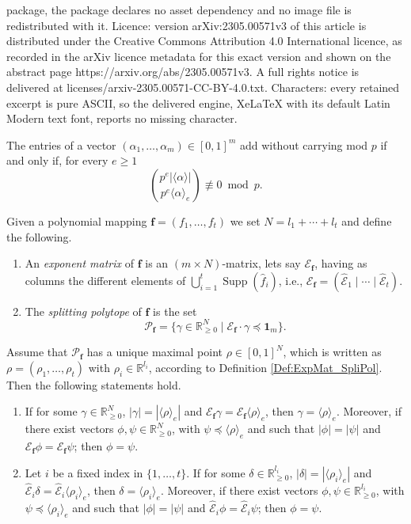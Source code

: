 \documentclass[10pt,a4paper]{amsart}
\newcommand{\Bf}{\boldsymbol{f}}
\newcommand{\E}{\mathcal{E}}
\newcommand{\RR}{\mathbb{R}}
\newcommand{\SP}{\mathcal{P}}
\newcommand{\Supp}{\operatorname{Supp}}
\newcommand{\tE}{\operatorname{\widehat{\E}}}
\begin{document}
package, the package declares no asset dependency and no image file is redistributed with it. Licence: version arXiv:2305.00571v3 of this article is distributed under the Creative Commons Attribution 4.0 International licence, as recorded in the arXiv licence metadata for this exact version and shown on the abstract page https://arxiv.org/abs/2305.00571v3. A full rights notice is delivered at licenses/arxiv-2305.00571-CC-BY-4.0.txt. Characters: every retained excerpt is pure ASCII, so the delivered engine, XeLaTeX with its default Latin Modern text font, reports no missing character.
\begin{corollary}\label{Cor:adding wo carrying}
	The entries of a vector $(\alpha_1,\ldots,\alpha_m)\in[0,1]^m$ add without carrying mod $p$ if and only if, for every $e\geq 1$
	\[\binom{p^e |\langle\alpha\rangle|}{p^e \langle\alpha\rangle_e}  \not \equiv 0 \bmod p.
	\]
\end{corollary}

\begin{definition}\label{Def:ExpMat_SpliPol}
Given a polynomial mapping $\Bf=(f_1, \ldots, f_t)$ we set $N=l_1+\cdots+l_t$ and define the following.
\begin{enumerate}
\item An \textit{exponent matrix} of $\Bf$ is an $(m \times N)$-matrix, lets say $\E_{\Bf}$, having as columns the different elements of $\bigcup_{i=1}^t\Supp(\hat{f}_i)$, i.e., $\E_{\Bf}=(\tE_{1}\mid \cdots\mid \tE_{t})$.
\item The \textit{splitting polytope} of $\Bf$ is the set 
\[\SP_{\Bf}=\{\gamma \in \RR_{\geq 0}^{N} \mid \E_{\Bf}\cdot \gamma \preceq \textbf{1}_{m}\}.\]
\end{enumerate}
\end{definition}

\begin{lemma}\label{equal-vector}
Assume that $\SP_{\Bf}$ has a unique maximal point $\rho\in [0,1]^N$, which is written as  $\rho=(\rho_1, \ldots, \rho_t)$ with $\rho_i \in \RR^{l_i}$, according to Definition \ref{Def:ExpMat_SpliPol}. Then the following statements hold.
\begin{enumerate}
\item If for some $\gamma \in \RR_{\geq 0}^N$, $|\gamma|=|\langle \rho \rangle_e|$ and $\E_{\Bf} \gamma = \E_{\Bf}  \langle \rho \rangle_e$,  then $ \gamma = \langle \rho \rangle_e $. Moreover, if 
there exist vectors $\phi, \psi \in \RR_{\geq 0}^{N}$, with $\psi \preceq \langle \rho \rangle_e$ and such that $|\phi|=|\psi|$ and  $\E_{\Bf} \phi = \E_{\Bf} \psi$;  then $\phi=\psi$.
\item Let $i$ be a fixed index in $\{1,\ldots,t\}$. If for some $\delta \in \RR_{\geq 0}^{l_i}$, $|\delta|=|\langle \rho_i \rangle_e|$ and $\tE_i \delta = \tE_i  \langle \rho_i \rangle_e$, then $ \delta = \langle \rho_i \rangle_e $. Moreover, if  there exist vectors $\phi, \psi  \in \RR_{\geq 0}^{l_i}$, with $\psi \preceq \langle \rho_i \rangle_e$ and such that $|\phi|=|\psi|$ and  $\tE_i \phi = \tE_i \psi$;  then $\phi=\psi$.
\end{enumerate}
\end{lemma}
\end{document}
